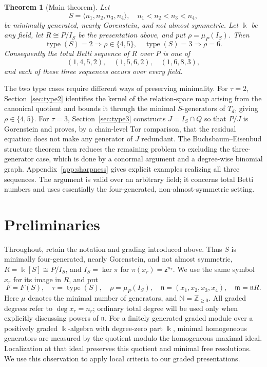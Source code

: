 \documentclass[10pt]{amsart}
\theoremstyle{plain}
\newtheorem{theorem}{Theorem}
\begin{document}
\begin{theorem}[Main theorem]\label{thm:main}
Let
\[
S=\langle n_1,n_2,n_3,n_4\rangle,
\quad n_1<n_2<n_3<n_4,
\]
be minimally generated, nearly Gorenstein, and not almost symmetric.  Let
\(\Bbbk\) be any field, let \(R\cong P/I_S\) be the presentation above, and
put \(\rho=\mu_P(I_S)\).  Then
\[
\operatorname{type}(S)=2\Longrightarrow \rho\in\{4,5\},
\quad
\operatorname{type}(S)=3\Longrightarrow \rho=6.
\]
Consequently the total Betti sequence of \(R\) over \(P\) is one of
\[
(1,4,5,2),\quad (1,5,6,2),\quad (1,6,8,3),
\]
and each of these three sequences occurs over every field.
\end{theorem}

The two type cases require different ways of preserving minimality.  For
\(\tau=2\), Section~\ref{sec:type2} identifies the kernel of the relation-space
map arising from the canonical quotient and bounds it through the minimal
\(S\)-generators of \(T_d\), giving \(\rho\in\{4,5\}\).  For \(\tau=3\),
Section~\ref{sec:type3} constructs \(J=I_S\cap Q\) so that \(P/J\) is
Gorenstein and proves, by a chain-level Tor comparison, that the residual
equation does not make any generator of \(J\) redundant.  The
Buchsbaum--Eisenbud structure theorem then reduces the remaining problem to
excluding the three-generator case, which is done by a conormal argument
and a degree-wise binomial graph.  Appendix~\ref{app:sharpness} gives
explicit examples realizing all three sequences.  The argument is valid
over an arbitrary field; it concerns total Betti numbers and uses
essentially the four-generated, non-almost-symmetric setting.

\section{Preliminaries}\label{sec:preliminaries}

Throughout, retain the notation and grading introduced above.  Thus
\(S\) is minimally four-generated, nearly Gorenstein, and not almost
symmetric, \(R=\Bbbk[S]\cong P/I_S\), and \(I_S=\ker\pi\) for
\(\pi(x_r)=\mathsf z^{n_r}\).  We use the same symbol \(x_r\) for its image
in \(R\), and put
\begin{equation*}
F=F(S),\quad \tau=\operatorname{type}(S),\quad
\rho=\mu_P(I_S),\quad
\mathfrak n=(x_1,x_2,x_3,x_4),\quad \mathfrak m=\mathfrak nR.
\end{equation*}
Here \(\mu\) denotes the minimal number of generators, and
\(\mathbb N=\mathbb Z_{\ge0}\).  All graded degrees refer to
\(\deg x_r=n_r\); ordinary total degree will be used only when
explicitly discussing powers of \(\mathfrak n\).
For a finitely generated graded module over a positively graded
\(\Bbbk\)-algebra with degree-zero part \(\Bbbk\), minimal homogeneous
generators are measured by the quotient modulo the homogeneous maximal
ideal.  Localization at that ideal preserves this quotient and minimal
free resolutions.  We use this observation to apply local criteria to
our graded presentations.
\end{document}
